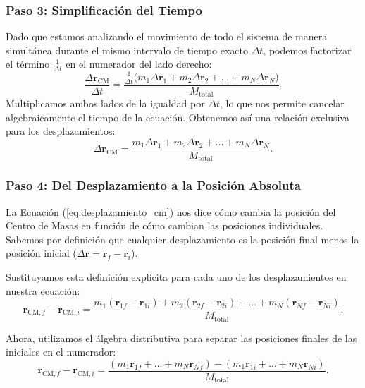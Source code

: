 \documentclass[11pt,a4paper]{book}
\begin{document}
\subsubsection{Paso 3: Simplificación del Tiempo}

Dado que estamos analizando el movimiento de todo el sistema de manera simultánea durante el mismo intervalo de tiempo exacto $\Delta t$, podemos factorizar el término $\frac{1}{\Delta t}$ en el numerador del lado derecho:
\begin{equation}
    \frac{\Delta \boldsymbol{r}_{\text{CM}}}{\Delta t} = \frac{\frac{1}{\Delta t} \big( m_1\Delta \boldsymbol{r}_1 + m_2\Delta \boldsymbol{r}_2 + \dots + m_N\Delta \boldsymbol{r}_N \big)}{M_{\text{total}}}.
\end{equation}
Multiplicamos ambos lados de la igualdad por $\Delta t$, lo que nos permite cancelar algebraicamente el tiempo de la ecuación. Obtenemos así una relación exclusiva para los desplazamientos:
\begin{equation}
    \Delta \boldsymbol{r}_{\text{CM}} = \frac{m_1\Delta \boldsymbol{r}_1 + m_2\Delta \boldsymbol{r}_2 + \dots + m_N\Delta \boldsymbol{r}_N}{M_{\text{total}}}.
    \label{eq:desplazamiento_cm}
\end{equation}

\subsubsection{Paso 4: Del Desplazamiento a la Posición Absoluta}

La Ecuación (\ref{eq:desplazamiento_cm}) nos dice cómo cambia la posición del Centro de Masas en función de cómo cambian las posiciones individuales. Sabemos por definición que cualquier desplazamiento es la posición final menos la posición inicial ($\Delta \boldsymbol{r} = \boldsymbol{r}_f - \boldsymbol{r}_i$). 

Sustituyamos esta definición explícita para cada uno de los desplazamientos en nuestra ecuación:
\begin{equation}
    \boldsymbol{r}_{\text{CM},f} - \boldsymbol{r}_{\text{CM},i} = \frac{m_1(\boldsymbol{r}_{1f} - \boldsymbol{r}_{1i}) + m_2(\boldsymbol{r}_{2f} - \boldsymbol{r}_{2i}) + \dots + m_N(\boldsymbol{r}_{Nf} - \boldsymbol{r}_{Ni})}{M_{\text{total}}}.
\end{equation}

Ahora, utilizamos el álgebra distributiva para separar las posiciones finales de las iniciales en el numerador:
\begin{equation}
    \boldsymbol{r}_{\text{CM},f} - \boldsymbol{r}_{\text{CM},i} = \frac{(m_1\boldsymbol{r}_{1f} + \dots + m_N\boldsymbol{r}_{Nf}) - (m_1\boldsymbol{r}_{1i} + \dots + m_N\boldsymbol{r}_{Ni})}{M_{\text{total}}}.
\end{equation}
\end{document}
